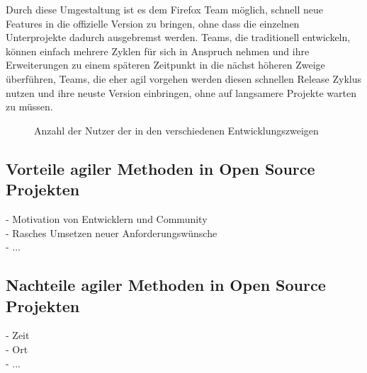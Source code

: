 Durch diese Umgestaltung ist es dem Firefox Team möglich, schnell neue Features in die offizielle Version zu bringen, ohne dass die einzelnen Unterprojekte dadurch ausgebremst werden. Teams, die traditionell entwickeln, können einfach mehrere Zyklen für sich in Anspruch nehmen und ihre Erweiterungen zu einem späteren Zeitpunkt in die nächst höheren Zweige überführen, Teams, die eher agil vorgehen werden diesen schnellen Release Zyklus nutzen und ihre neuste Version einbringen, ohne auf langsamere Projekte warten zu müssen.
\begin{figure}[h]
	\centering
	\caption{Anzahl der Nutzer der in den verschiedenen Entwicklungszweigen}
	\label{fireusers}
\end{figure}


\subsection{Vorteile agiler Methoden in Open Source Projekten}
  - Motivation von Entwicklern und Community\\
  - Rasches Umsetzen neuer Anforderungswünsche\\
  - ...
  
\subsection{Nachteile agiler Methoden in Open Source Projekten}
  - Zeit\\
  - Ort\\
  - ...


